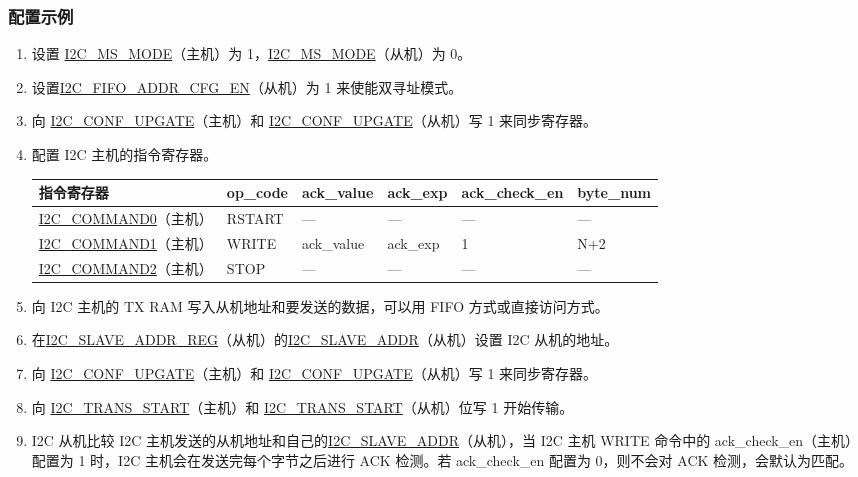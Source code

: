 \documentclass[main\_\_CN.tex]{subfiles}
\begin{document}
\subsubsection{配置示例}

\begin{enumerate}
\item 设置 \hyperref[fielddesc:I2CMSMODE]{I2C\_MS\_MODE}（主机）为 1，\hyperref[fielddesc:I2CMSMODE]{I2C\_MS\_MODE}（从机）为 0。
\item 设置\hyperref[fielddesc:I2CFIFOADDRCFGEN]{I2C\_FIFO\_ADDR\_CFG\_EN}（从机）为 1 来使能双寻址模式。
\item 向 \hyperref[fielddesc:I2CCONFUPGATE]{I2C\_CONF\_UPGATE}（主机）和 \hyperref[fielddesc:I2CCONFUPGATE]{I2C\_CONF\_UPGATE}（从机）写 1 来同步寄存器。
\item 配置 I2C 主机的指令寄存器。
\begin{longtable}{ | p{4cm} | p{2cm} | p{2cm} | p{2cm} |p{2cm} | p{2cm} |}
\hline\rowcolor{lightgray}
指令寄存器& op\_code & ack\_value&ack\_exp&ack\_check\_en&byte\_num  \\ \hline
\hyperref[fielddesc:I2CCOMMAND0]{I2C\_COMMAND0}（主机）& RSTART& ---&---&---&---  \\ \hline
\hyperref[fielddesc:I2CCOMMAND1]{I2C\_COMMAND1}（主机）& WRITE& ack\_value&ack\_exp&1&N+2  \\ \hline
\hyperref[fielddesc:I2CCOMMAND2]{I2C\_COMMAND2}（主机）& STOP& ---&---&---&---  \\ \hline
\end{longtable}
\item 向 I2C 主机的 TX RAM 写入从机地址和要发送的数据，可以用 FIFO 方式或直接访问方式。
\item 在\hyperref[regdesc:I2CSLAVEADDRREG]{I2C\_SLAVE\_ADDR\_REG}（从机）的\hyperref[fielddesc:I2CSLAVEADDR]{I2C\_SLAVE\_ADDR}（从机）设置 I2C 从机的地址。
\item 向 \hyperref[fielddesc:I2CCONFUPGATE]{I2C\_CONF\_UPGATE}（主机）和 \hyperref[fielddesc:I2CCONFUPGATE]{I2C\_CONF\_UPGATE}（从机）写 1 来同步寄存器。
\item 向 \hyperref[fielddesc:I2CTRANSSTART]{I2C\_TRANS\_START}（主机）和 \hyperref[fielddesc:I2CTRANSSTART]{I2C\_TRANS\_START}（从机）位写 1 开始传输。
\item I2C 从机比较 I2C 主机发送的从机地址和自己的\hyperref[fielddesc:I2CSLAVEADDR]{I2C\_SLAVE\_ADDR}（从机），当 I2C 主机 WRITE 命令中的 ack\_check\_en（主机）配置为 1 时，I2C 主机会在发送完每个字节之后进行 ACK 检测。若 ack\_check\_en 配置为 0，则不会对 ACK 检测，会默认为匹配。

\end{enumerate}
\end{document}
